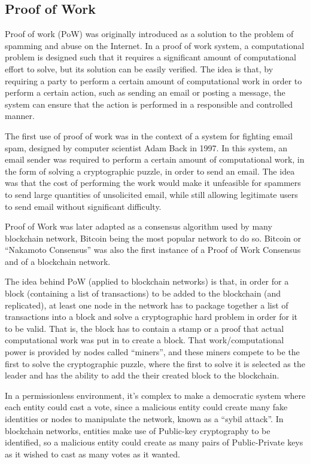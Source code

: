 \subsection*{\textbf{Proof of Work}}

Proof of work (PoW) \cite{back2002hashcash} was originally introduced as a solution to the problem of spamming and abuse on the Internet. In a proof of work system, a computational problem is designed such that it requires a significant amount of computational effort to solve, but its solution can be easily verified. The idea is that, by requiring a party to perform a certain amount of computational work in order to perform a certain action, such as sending an email or posting a message, the system can ensure that the action is performed in a responsible and controlled manner.

The first use of proof of work was in the context of a system for fighting email spam, designed by computer scientist Adam Back in 1997. In this system, an email sender was required to perform a certain amount of computational work, in the form of solving a cryptographic puzzle, in order to send an email. The idea was that the cost of performing the work would make it unfeasible for spammers to send large quantities of unsolicited email, while still allowing legitimate users to send email without significant difficulty.


Proof of Work was later adapted as a consensus algorithm used by many blockchain network, Bitcoin \cite{nakamoto2008bitcoin} being the most popular network to do so.
Bitcoin or ``Nakamoto Consensus'' was also the first instance of a Proof of Work Consensus and of a blockchain network.

The idea behind PoW (applied to blockchain networks) is that, in order for a block (containing a list of transactions) to be added to the blockchain (and replicated), at least one node in the network has to package together a list of transactions into a block and solve a cryptographic hard problem in order for it to be valid.
That is, the block has to contain a stamp or a proof that actual computational work was put in to create a block.
That work/computational power is provided by nodes called ``miners'', and these miners compete to be the first to solve the cryptographic puzzle, where the first to solve it is selected as the leader and has the ability to add the their created block to the blockchain.

In a permissionless environment, it's complex to make a democratic system where each entity could cast a vote, since a malicious entity could create many fake identities or nodes to manipulate the network, known as a ``sybil attack''.
In blockchain networks, entities make use of Public-key cryptography to be identified, so a malicious entity could create as many pairs of Public-Private keys as it wished to cast as many votes as it wanted.

